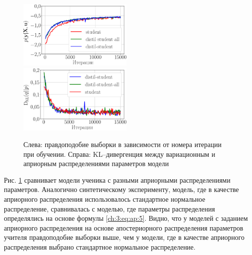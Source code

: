 \begin{figure}[!ht]
\includegraphics[width=0.5\textwidth]{results/bayesdistil/fashionmnist_likelihood_2_layers.eps}
\includegraphics[width=0.5\textwidth]{results/bayesdistil/fashionmnist_D_KL_2_layers.eps}
\caption{Слева: правдоподобие выборки в зависимости от номера итерации при обучении. Справа: KL--дивергенция между вариационным и априорным распределениями параметров модели}
\label{ch:3:exp:fig3}
\end{figure}

Рис. \ref{ch:3:exp:fig3} сравнивает модели ученика с разными априорными распределениями параметров.
Аналогично синтетическому эксперименту, модель, где в качестве априорного распределения использовалось стандартное нормальное распределение, сравнивалась с моделью, где параметры распределения определялись на основе формулы \eqref{ch:3:eq:ap:5}. Видно, что у моделей с заданием априорного распределения на основе апостериорного распределения параметров учителя правдоподобие выборки выше, чем у модели, где в качестве априорного распределения выбрано стандартное нормальное распределение.

